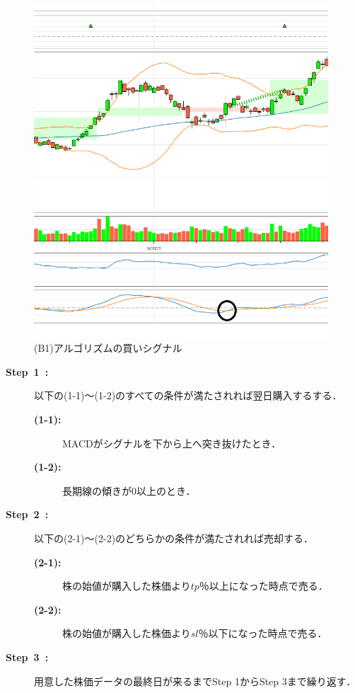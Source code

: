 \begin{figure}[t]
  \centering
  \includegraphics[width=110mm]{fig/macdonly.png}
  \caption{(B1)アルゴリズムの買いシグナル}
  \label{fig:macdonly}
 \end{figure}
\begin{description}
  \item[\textbf{Step~1~:}]以下の(1-1)～(1-2)のすべての条件が満たされれば翌日購入するする．
  \begin{description}
    \item[\textbf{(1-1):}]MACDがシグナルを下から上へ突き抜けたとき．
    \item[\textbf{(1-2):}]長期線の傾きが0以上のとき．
   \end{description}  
  
  \item[\textbf{Step~2~:}]以下の(2-1)～(2-2)のどちらかの条件が満たされれば売却する．
   \begin{description}
    \item[\textbf{(2-1):}]株の始値が購入した株価より$tp$％以上になった時点で売る．
    \item[\textbf{(2-2):}]株の始値が購入した株価より$sl$％以下になった時点で売る． 
   \end{description}
  \item[\textbf{Step~3~:}]用意した株価データの最終日が来るまでStep 1からStep 3まで繰り返す．
  \end{description}
  
